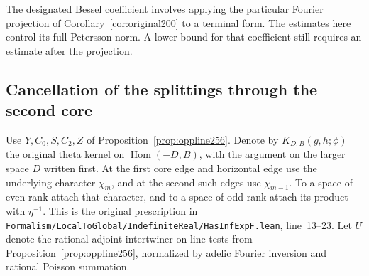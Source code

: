 \documentclass[a4paper,11pt]{article}
\theoremstyle{definition}
\theoremstyle{remark}
\newcommand{\srcloc}[2]{{\small\nolinkurl{#1.lean}}, line~#2}
\numberwithin{equation}{section}
\begin{document}
The designated Bessel coefficient involves applying the
particular Fourier projection of Corollary~\ref{cor:original200}
to a terminal form. The estimates here control its full
Petersson norm. A lower bound for that coefficient still
requires an estimate after the projection.

\subsection{Cancellation of the splittings through the second core}\label{nav:VII-40}
Use \(Y,C_0,S,C_2,Z\) of Proposition~\ref{prop:oppline256}.
Denote by \(K_{D,B}(g,h;\phi)\) the original theta kernel on
\(\operatorname{Hom}(-D,B)\), with the argument on the larger
space \(D\) written first. At the first core edge and horizontal
edge use the underlying character \(\chi_m\), and at the
second such edges use \(\chi_{m-1}\). To a space of even
rank attach that character, and to a space of odd rank attach
its product with \(\eta^{-1}\). This is the original prescription
in \srcloc{Formalism/LocalToGlobal/IndefiniteReal/HasInfExpF}{13--23}.
Let \(U\) denote the rational adjoint intertwiner on line tests
from Proposition~\ref{prop:oppline256}, normalized by adelic
Fourier inversion and rational Poisson summation.
\end{document}
